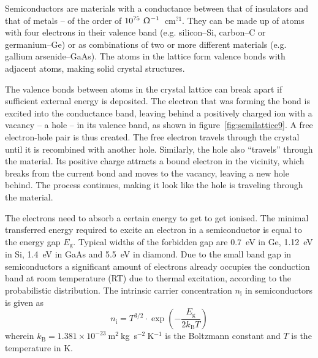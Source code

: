 Semiconductors are materials with a conductance between that of insulators and that of metals -- of the order of  $10^{?5}~\Upomega^{-1}$~cm$^{?1}$. They can be made up of atoms with four electrons in their valence band (e.g. silicon--Si, carbon--C or germanium--Ge) or as combinations of two or more different materials (e.g. gallium arsenide--GaAs). The atoms in the lattice form valence bonds with adjacent atoms, making solid crystal structures. 

The valence bonds between atoms in the crystal lattice can break apart if sufficient external energy is deposited. The electron that was forming the bond is excited into the conductance band, leaving behind a positively charged ion with a vacancy -- a hole -- in its valence band, as shown in figure~\ref{fig:semilattice9}. A free electron-hole pair is thus created. The free electron travels through the crystal until it is recombined with another hole. Similarly, the hole also ``travels'' through the material. Its positive charge attracts a bound electron in the vicinity, which breaks from the current bond and moves to the vacancy, leaving a new hole behind. The process continues, making it look like the hole is traveling through the material.




The electrons need to absorb a certain energy to get to get ionised. The minimal transferred energy required to excite an electron in a semiconductor is equal to the energy gap $E_\mathrm{g}$. Typical widths of the forbidden gap are 0.7~eV in Ge, 1.12~eV in Si, 1.4~eV in GaAs and 5.5~eV in diamond. Due to the small band gap in semiconductors a significant amount of electrons already occupies the conduction band at room temperature (RT) due to thermal excitation, according to the probabilistic distribution. The intrinsic carrier concentration $n_\mathrm{i}$ in semiconductors is given as
\begin{equation}
\label{eq:intrinsiccarrier}
n_\mathrm{i} = T^{3/2} \cdot \exp\left(-\frac{E_\mathrm{g}}{2k_\mathrm{B}T}\right)
\end{equation} 
wherein $k_\mathrm{B} = 1.381\times10^{-23}~$m$^2~$kg~s$^{-2}~$K$^{-1}$ is the Boltzmann constant and $T$ is the temperature in K. 

